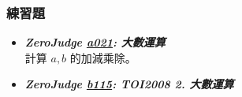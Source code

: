 \subsubsection*{練習題}
\begin{itemize}[label={\Checkmark}]
\item \textbf{\textit{ZeroJudge \href{http://zerojudge.tw/ShowProblem?problemid=a021}{a021}: 大數運算}}\\
計算 $a,b$ 的加減乘除。
\item \textbf{\textit{ZeroJudge \href{http://zerojudge.tw/ShowProblem?problemid=b115}{b115}: TOI2008 2. 大數運算}}\\

\end{itemize}
